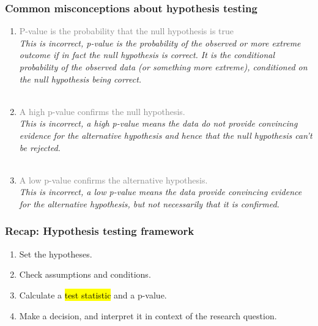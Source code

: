 \documentclass[slidestop,compress,mathserif,12pt,t,professionalfonts,xcolor=table]{beamer}
\begin{document}
\begin{frame}
\frametitle{Common misconceptions about hypothesis testing}

\begin{enumerate}

\item \textcolor{gray}{P-value is the probability that the null hypothesis is true} \\
\textit{This is incorrect, p-value is the probability of the observed or more extreme outcome if in fact the null hypothesis is correct. It is the conditional probability of the observed data (or something more extreme), conditioned on the null hypothesis being correct.} \\
$\:$ \\

\pause

\item  \textcolor{gray}{A high p-value confirms the null hypothesis.}\\
\textit{This is incorrect, a high p-value means the data do not provide convincing evidence for the alternative hypothesis and hence that the null hypothesis can't be rejected.} \\
$\:$ \\

\pause

\item   \textcolor{gray}{A low p-value confirms the alternative hypothesis.} \\
\textit{This is incorrect, a low p-value means the data provide convincing evidence for the alternative hypothesis, but not necessarily that it is confirmed.} \\

\end{enumerate}

\end{frame}


\begin{frame}
\frametitle{Recap: Hypothesis testing framework}

\begin{enumerate}

\item Set the hypotheses.

\item Check assumptions and conditions.

\item Calculate a \hl{test statistic} and a p-value.

\item Make a decision, and interpret it in context of the research question.

\end{enumerate}

\end{frame}
\end{document}
